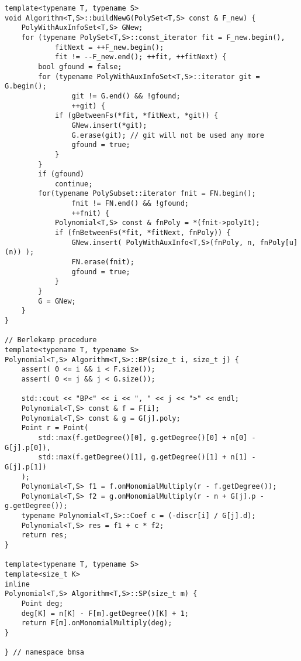 \begin{lstlisting}
template<typename T, typename S>
void Algorithm<T,S>::buildNewG(PolySet<T,S> const & F_new) {
    PolyWithAuxInfoSet<T,S> GNew;
    for (typename PolySet<T,S>::const_iterator fit = F_new.begin(),
            fitNext = ++F_new.begin();
            fit != --F_new.end(); ++fit, ++fitNext) {
        bool gfound = false;
        for (typename PolyWithAuxInfoSet<T,S>::iterator git = G.begin();
                git != G.end() && !gfound;
                ++git) {
            if (gBetweenFs(*fit, *fitNext, *git)) {
                GNew.insert(*git);
                G.erase(git); // git will not be used any more
                gfound = true;
            }
        }
        if (gfound)
            continue;
        for(typename PolySubset::iterator fnit = FN.begin();
                fnit != FN.end() && !gfound;
                ++fnit) {
            Polynomial<T,S> const & fnPoly = *(fnit->polyIt);
            if (fnBetweenFs(*fit, *fitNext, fnPoly)) {
                GNew.insert( PolyWithAuxInfo<T,S>(fnPoly, n, fnPoly[u](n)) );
                FN.erase(fnit);
                gfound = true;
            }
        }
        G = GNew;
    }
}

// Berlekamp procedure
template<typename T, typename S>
Polynomial<T,S> Algorithm<T,S>::BP(size_t i, size_t j) {
    assert( 0 <= i && i < F.size());
    assert( 0 <= j && j < G.size());

    std::cout << "BP<" << i << ", " << j << ">" << endl;
    Polynomial<T,S> const & f = F[i];
    Polynomial<T,S> const & g = G[j].poly;
    Point r = Point(
        std::max(f.getDegree()[0], g.getDegree()[0] + n[0] - G[j].p[0]),
        std::max(f.getDegree()[1], g.getDegree()[1] + n[1] - G[j].p[1])
    );
    Polynomial<T,S> f1 = f.onMonomialMultiply(r - f.getDegree());
    Polynomial<T,S> f2 = g.onMonomialMultiply(r - n + G[j].p - g.getDegree());
    typename Polynomial<T,S>::Coef c = (-discr[i] / G[j].d);
    Polynomial<T,S> res = f1 + c * f2;
    return res;
}

template<typename T, typename S>
template<size_t K>
inline
Polynomial<T,S> Algorithm<T,S>::SP(size_t m) {
    Point deg;
    deg[K] = n[K] - F[m].getDegree()[K] + 1;
    return F[m].onMonomialMultiply(deg);
}

} // namespace bmsa
\end{lstlisting}

